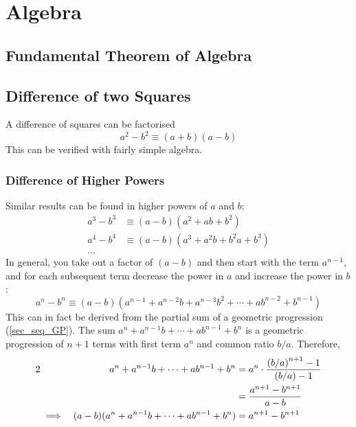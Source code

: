 \section{Algebra}

\subsection{Fundamental Theorem of Algebra}

\subsection{Difference of two Squares}

A difference of squares can be factorised
\begin{equation}
a^2 - b^2 \equiv (a + b)(a - b)
\end{equation}
This can be verified with fairly simple
algebra.

\subsubsection{Difference of Higher Powers}

Similar results can be found in higher powers of \(a\) and \(b\):
\begin{align*}
a^3 - b^3 &\equiv (a - b)(a^2 + ab + b^2) \\
a^4 - b^4 &\equiv (a - b)(a^3 + a^2b + b^2a + b^3) \\
\dots
\end{align*}
In general, you take out a factor of \((a - b)\) and then start with the
term \(a^{n - 1}\), and for each subsequent term decrease the power in \(a\)
and increase the power in \(b\):
\begin{equation}
a^n - b^n \equiv (a - b)(a^{n - 1} + a^{n - 2}b + a^{n - 3}b^2 + \dotsb +
                         ab^{n - 2} + b^{n - 1})
\end{equation}
This can in fact be derived from the partial sum of a geometric progression
(\ref{sec_seq_GP}). The sum \(a^n + a^{n - 1}b + \dotsb + ab^{n - 1} + b^n\) is
a geometric progression of \(n + 1\) terms with first term \(a^n\) and
common ratio \(b/a\).  Therefore,
\begin{alignat*}2
&&a^n + a^{n - 1}b + \dotsb + ab^{n - 1} + b^n &=
        a^n \cdot \frac{\pqty{b / a}^{n + 1} - 1}{(b / a) - 1} \\
&&    &= \frac{a^{n + 1} - b^{n + 1}}{a - b} \\
&\implies& (a - b)(a^n + a^{n - 1}b + \dotsb + ab^{n - 1} + b^n) &=
        a^{n + 1} - b^{n + 1}
\end{alignat*}

